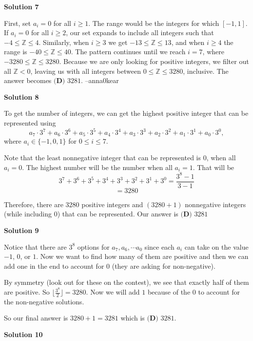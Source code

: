 \begin{enumerate}
 



\textbf{Solution 7}

First, set $a_i=0$ for all $i\geq1$. The range would be the integers for which $[-1,1]$. If $a_i=0$ for all $i\geq2$, our set expands to include all integers such that $-4\leq\mathbb{Z}\leq4$. Similarly, when $i\geq3$ we get $-13\leq\mathbb{Z}\leq13$, and when $i\geq4$ the range is $-40\leq\mathbb{Z}\leq40$. The pattern continues until we reach $i=7$, where $-3280\leq\mathbb{Z}\leq3280$. Because we are only looking for positive integers, we filter out all $\mathbb{Z}<0$, leaving us with all integers between $0\leq\mathbb{Z}\leq3280$, inclusive. The answer becomes $\boxed{\textbf{(D) } 3281}$.  --anna0kear

 



\textbf{Solution 8}

To get the number of integers, we can get the highest positive integer that can be represented using 
 \[a_7\cdot3^7+a_6\cdot3^6+a_5\cdot3^5+a_4\cdot3^4+a_3\cdot3^3+a_2\cdot3^2+a_1\cdot3^1+a_0\cdot3^0,\]where $a_i\in \{-1,0,1\}$ for $0\le i \le 7$.

 Note that the least nonnegative integer that can be represented is $0$, when all $a_i=0$. The highest number will be the number when all $a_i=1$. That will be 
 \[3^7+3^6+3^5+3^4+3^3+3^2+3^1+3^0=\frac{3^8-1}{3-1}\] 
 \[=3280\]

 Therefore, there are $3280$ positive integers and $(3280+1)$ nonnegative integers (while including $0$) that can be represented. Our answer is $\boxed{\textbf{(D) } 3281}$




\textbf{Solution 9}

Notice that there are $3^8$ options for $a_7, a_6, \cdots a_0$ since each $a_i$ can take on the value $-1$, $0$, or $1$. Now we want to find how many of them are positive and then we can add one in the end to account for $0$ (they are asking for non-negative). 

 By symmetry (look out for these on the contest), we see that exactly half of them are positive. So $\lfloor{\frac{3^8}{2}}\rfloor = 3280.$ Now we will add $1$ because of the $0$ to account for the non-negative solutions. 

 So our final answer is $3280 + 1 = 3281$ which is $\boxed{\textbf{(D) } 3281}$.

 



\textbf{Solution 10}


\end{enumerate}
